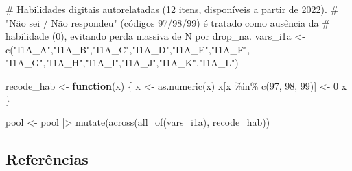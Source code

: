 \documentclass[
  man,
  floatsintext,
  longtable,
  a4paper,
  nolmodern,
  notxfonts,
  notimes,
  colorlinks=true,linkcolor=blue,citecolor=blue,urlcolor=blue]{apa7}
\newenvironment{Shaded}{\begin{snugshade}}{\end{snugshade}}
\newcommand{\CommentTok}[1]{\textcolor[rgb]{0.37,0.37,0.37}{#1}}
\newcommand{\ControlFlowTok}[1]{\textcolor[rgb]{0.00,0.23,0.31}{\textbf{#1}}}
\newcommand{\DecValTok}[1]{\textcolor[rgb]{0.68,0.00,0.00}{#1}}
\newcommand{\FunctionTok}[1]{\textcolor[rgb]{0.28,0.35,0.67}{#1}}
\newcommand{\NormalTok}[1]{\textcolor[rgb]{0.00,0.23,0.31}{#1}}
\newcommand{\OtherTok}[1]{\textcolor[rgb]{0.00,0.23,0.31}{#1}}
\newcommand{\SpecialCharTok}[1]{\textcolor[rgb]{0.37,0.37,0.37}{#1}}
\newcommand{\StringTok}[1]{\textcolor[rgb]{0.13,0.47,0.30}{#1}}
\begin{document}
\begin{codelisting}

\caption{\texttt{scripts/fit\_i1a.R (excerto)}}

\begin{Shaded}
\begin{Highlighting}[]
\CommentTok{\# Habilidades digitais autorelatadas (12 itens, disponíveis a partir de 2022).}
\CommentTok{\# "Não sei / Não respondeu" (códigos 97/98/99) é tratado como ausência da}
\CommentTok{\# habilidade (0), evitando perda massiva de N por drop\_na.}
\NormalTok{vars\_i1a }\OtherTok{\textless{}{-}} \FunctionTok{c}\NormalTok{(}\StringTok{"I1A\_A"}\NormalTok{,}\StringTok{"I1A\_B"}\NormalTok{,}\StringTok{"I1A\_C"}\NormalTok{,}\StringTok{"I1A\_D"}\NormalTok{,}\StringTok{"I1A\_E"}\NormalTok{,}\StringTok{"I1A\_F"}\NormalTok{,}
              \StringTok{"I1A\_G"}\NormalTok{,}\StringTok{"I1A\_H"}\NormalTok{,}\StringTok{"I1A\_I"}\NormalTok{,}\StringTok{"I1A\_J"}\NormalTok{,}\StringTok{"I1A\_K"}\NormalTok{,}\StringTok{"I1A\_L"}\NormalTok{)}

\NormalTok{recode\_hab }\OtherTok{\textless{}{-}} \ControlFlowTok{function}\NormalTok{(x) \{}
\NormalTok{  x }\OtherTok{\textless{}{-}} \FunctionTok{as.numeric}\NormalTok{(x)}
\NormalTok{  x[x }\SpecialCharTok{\%in\%} \FunctionTok{c}\NormalTok{(}\DecValTok{97}\NormalTok{, }\DecValTok{98}\NormalTok{, }\DecValTok{99}\NormalTok{)] }\OtherTok{\textless{}{-}} \DecValTok{0}
\NormalTok{  x}
\NormalTok{\}}

\NormalTok{pool }\OtherTok{\textless{}{-}}\NormalTok{ pool }\SpecialCharTok{|\textgreater{}}
  \FunctionTok{mutate}\NormalTok{(}\FunctionTok{across}\NormalTok{(}\FunctionTok{all\_of}\NormalTok{(vars\_i1a), recode\_hab))}
\end{Highlighting}
\end{Shaded}

\end{codelisting}

\subsection{Referências}\label{referuxeancias}
\end{document}
